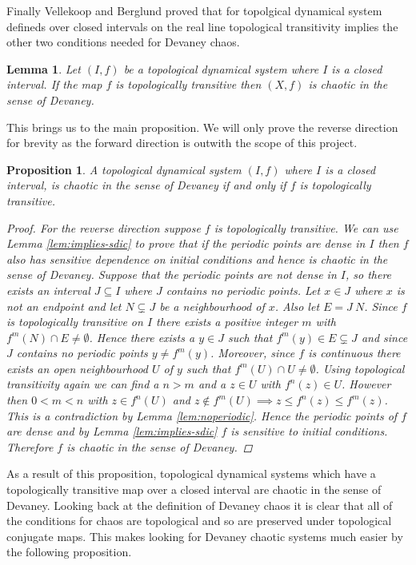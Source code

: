 \documentclass[11pt,a4paper,oneside]{memoir}
\theoremstyle{plain}
\newtheorem{prop}[thm]{Proposition}
\newtheorem{lem}[thm]{Lemma}
\theoremstyle{definition}
\begin{document}
Finally Vellekoop and Berglund proved that for topolgical dynamical system defineds over closed intervals on the real line topological transitivity implies the other two conditions needed for Devaney chaos.

\begin{lem}
    Let $(I, f)$ be a topological dynamical system where $I$ is a closed interval. If the map $f$ is topologically transitive then $(X, f)$ is chaotic in the sense of Devaney.
\end{lem}

This brings us to the main proposition. We will only prove the reverse direction for brevity as the forward direction is outwith the scope of this project.

\begin{prop}\label{prop:chaotic-transitive}
    A topological dynamical system $(I, f)$ where $I$ is a closed interval, is chaotic in the sense of Devaney if and only if $f$ is topologically transitive.
    \begin{proof}
        For the reverse direction suppose $f$ is topologically transitive. We can use Lemma \ref{lem:implies-sdic} to prove that if the periodic points are dense in $I$ then $f$ also has sensitive dependence on initial conditions and hence is chaotic in the sense of Devaney. Suppose that the periodic points are not dense in $I$, so there exists an interval $J \subseteq I$ where $J$ contains no periodic points. Let $x \in J$ where $x$ is not an endpoint and let $N \subsetneq J$ be a neighbourhood of $x$. Also let $E = J \ N$. Since $f$ is topologically transitive on $I$ there exists a positive integer $m$ with $f^m(N) \cap E \neq \emptyset$. Hence there exists a $y \in J$ such that $f^m(y) \in E \subsetneq J$ and since $J$ contains no periodic points $y \neq f^m(y)$. Moreover, since $f$ is continuous there exists an open neighbourhood $U$ of $y$ such that $f^m(U) \cap U \neq \emptyset$. Using topological transitivity again we can find a $n > m$ and a $z \in U$ with $f^n(z) \in U$. However then $0 < m < n$ with $z \in f^n(U)$ and $z \notin f^m(U) \implies z \leq f^n(z) \leq f^m(z)$. This is a contradiction by Lemma \ref{lem:noperiodic}. Hence the periodic points of $f$ are dense and by Lemma \ref{lem:implies-sdic} $f$ is sensitive to initial conditions. Therefore $f$ is chaotic in the sense of Devaney.
    \end{proof}
\end{prop}

As a result of this proposition, topological dynamical systems which have a topologically transitive map over a closed interval are chaotic in the sense of Devaney. Looking back at the definition of Devaney chaos it is clear that all of the conditions for chaos are topological and so are preserved under topological conjugate maps. This makes looking for Devaney chaotic systems much easier by the following proposition.
\end{document}
